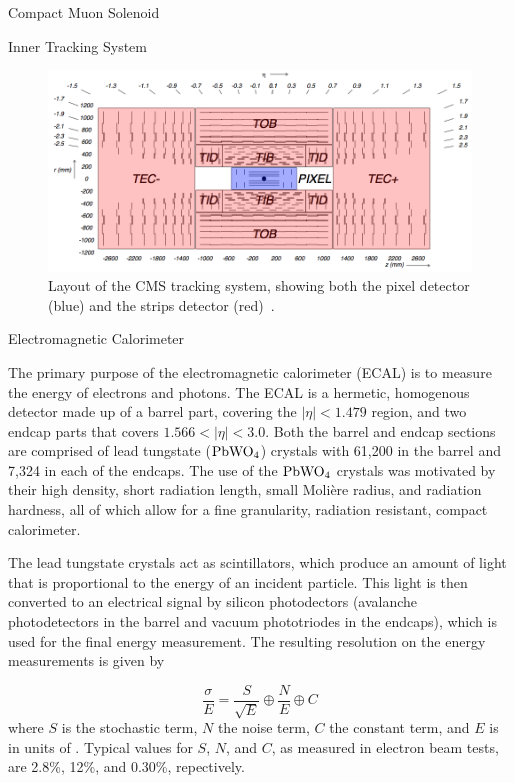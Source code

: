 \begin{section}{Compact Muon Solenoid}
\begin{subsection}{Inner Tracking System}
\begin{figure}[tbp!]
\begin{center}
\includegraphics[angle=0,width=0.80\columnwidth]{fig/cms_tracker.png}
\end{center}
\caption{Layout of the CMS tracking system, showing both the pixel detector (blue) and the strips detector (red)~\cite{Lenzi:2013xpa}.}
\label{fig:cms_tracker}
\end{figure}

\end{subsection}

\begin{subsection}{Electromagnetic Calorimeter}

The primary purpose of the electromagnetic calorimeter (ECAL) is to measure the energy of electrons and photons.
The ECAL is a hermetic, homogenous detector made up of a barrel part, covering the $|\eta| < 1.479$ region, and two endcap parts that covers $1.566 < |\eta| < 3.0$.
Both the barrel and endcap sections are comprised of lead tungstate ($\mathrm{PbWO_{4}}$) crystals with 61,200 in the barrel and 7,324 in each of the endcaps.
The use of the $\mathrm{PbWO_{4}}$ crystals was motivated by their high density, short radiation length, small Moli\`ere radius, and radiation hardness, all of which allow for a fine granularity, radiation resistant, compact calorimeter.

The lead tungstate crystals act as scintillators, which produce an amount of light that is proportional to the energy of an incident particle.
This light is then converted to an electrical signal by silicon photodectors (avalanche photodetectors in the barrel and vacuum phototriodes in the endcaps), which is used for the final energy measurement.
The resulting resolution on the energy measurements is given by 

\begin{equation}
\label{eq:ecal_resolution}
\frac{\sigma}{E} = \frac{S}{\sqrt{E}} \oplus \frac{N}{E} \oplus C
\end{equation}
where $S$ is the stochastic term, $N$ the noise term, $C$ the constant term, and $E$ is in units of \GeV.
Typical values for $S$, $N$, and $C$, as measured in electron beam tests, are 2.8\%, 12\%, and 0.30\%, repectively.


\end{subsection}
\end{section}
